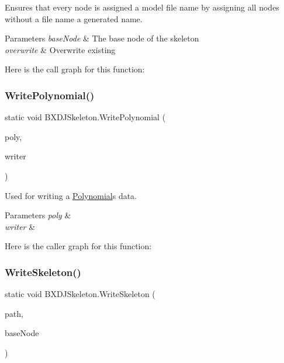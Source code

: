 Ensures that every node is assigned a model file name by assigning all nodes without a file name a generated name. 


\begin{DoxyParams}{Parameters}
{\em base\+Node} & The base node of the skeleton\\
\hline
{\em overwrite} & Overwrite existing\\
\hline
\end{DoxyParams}
Here is the call graph for this function\+:
\mbox{\label{class_b_x_d_j_skeleton_a19a49fdfc8bc3aca9b61adde4897900c}} 
\subsubsection{\texorpdfstring{Write\+Polynomial()}{WritePolynomial()}}
{\footnotesize\ttfamily static void B\+X\+D\+J\+Skeleton.\+Write\+Polynomial (\begin{DoxyParamCaption}\item[{\hyperlink{class_polynomial}{Polynomial}}]{poly,  }\item[{Xml\+Writer}]{writer }\end{DoxyParamCaption})\hspace{0.3cm}{\ttfamily [static]}}



Used for writing a \hyperlink{class_polynomial}{Polynomial}\textquotesingle{}s data. 


\begin{DoxyParams}{Parameters}
{\em poly} & \\
\hline
{\em writer} & \\
\hline
\end{DoxyParams}
Here is the caller graph for this function\+:
\mbox{\label{class_b_x_d_j_skeleton_a51284ed9f19393c90ac2fb0f854880f4}} 
\subsubsection{\texorpdfstring{Write\+Skeleton()}{WriteSkeleton()}}
{\footnotesize\ttfamily static void B\+X\+D\+J\+Skeleton.\+Write\+Skeleton (\begin{DoxyParamCaption}\item[{string}]{path,  }\item[{\hyperlink{class_rigid_node___base}{Rigid\+Node\+\_\+\+Base}}]{base\+Node }\end{DoxyParamCaption})\hspace{0.3cm}{\ttfamily [static]}}



